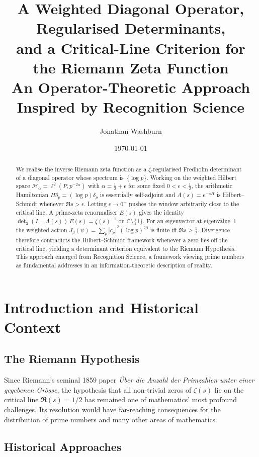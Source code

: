 \documentclass[12pt]{article}
\title{A Weighted Diagonal Operator, Regularised Determinants,\\
and a Critical-Line Criterion for the Riemann Zeta Function\\[0.5em]
\large{An Operator-Theoretic Approach Inspired by Recognition Science}}
\author{Jonathan Washburn}
\date{\today}
\theoremstyle{definition}
\theoremstyle{remark}
\newcommand{\Hspace}{\mathcal H}
\begin{document}
\maketitle

\begin{abstract}
We realise the inverse Riemann zeta function as a $\zeta$-regularised Fredholm
determinant of a diagonal operator whose spectrum is~\(\{\log p\}\).
Working on the weighted Hilbert space
\(\Hspace_{\alpha}=\ell^{2}(P,p^{-2\alpha})\) with
\(\alpha = \tfrac12+\epsilon\) for some fixed \(0<\epsilon<\tfrac12\),
the arithmetic Hamiltonian
\(H\delta_{p}=(\log p)\delta_{p}\) is essentially self-adjoint and
\(A(s)=e^{-sH}\) is Hilbert--Schmidt whenever \(\Re s>\epsilon\).
Letting \(\epsilon\to0^{+}\) pushes the window arbitrarily close to the
critical line.
A prime-zeta renormaliser \(E(s)\) gives the identity
\(\det_{2}(I-A(s))\,E(s)=\zeta(s)^{-1}\) on \(\mathbb C\setminus\{1\}\).
For an eigenvector at eigenvalue~\(1\) the weighted action
\(J_\beta(\psi)=\sum_p|c_p|^{2}(\log p)^{2\beta}\)
is finite iff \(\Re s\ge\tfrac12\).
Divergence therefore contradicts the Hilbert--Schmidt framework
whenever a zero lies off the critical line, yielding a determinant
criterion equivalent to the Riemann Hypothesis.
This approach emerged from Recognition Science, a framework viewing prime numbers
as fundamental addresses in an information-theoretic description of reality.
\end{abstract}

\tableofcontents

\section{Introduction and Historical Context}

\subsection{The Riemann Hypothesis}

Since Riemann's seminal 1859 paper \emph{\"Uber die Anzahl der Primzahlen unter 
einer gegebenen Gr\"osse}, the hypothesis that all non-trivial zeros of 
$\zeta(s)$ lie on the critical line $\Re(s) = 1/2$ has remained one of 
mathematics' most profound challenges. Its resolution would have far-reaching 
consequences for the distribution of prime numbers and many other areas of 
mathematics.

\subsection{Historical Approaches}
\end{document}
